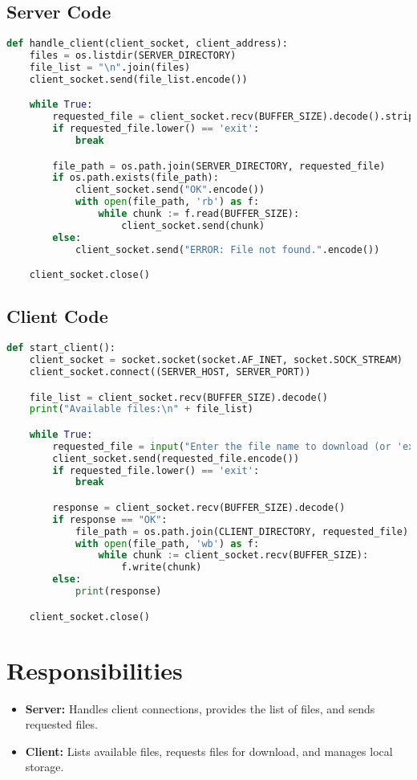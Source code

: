 \documentclass{article}
\begin{document}
\subsection{Server Code}
\begin{lstlisting}[language=Python, caption={Server File Handling}]
def handle_client(client_socket, client_address):
    files = os.listdir(SERVER_DIRECTORY)
    file_list = "\n".join(files)
    client_socket.send(file_list.encode())

    while True:
        requested_file = client_socket.recv(BUFFER_SIZE).decode().strip()
        if requested_file.lower() == 'exit':
            break

        file_path = os.path.join(SERVER_DIRECTORY, requested_file)
        if os.path.exists(file_path):
            client_socket.send("OK".encode())
            with open(file_path, 'rb') as f:
                while chunk := f.read(BUFFER_SIZE):
                    client_socket.send(chunk)
        else:
            client_socket.send("ERROR: File not found.".encode())

    client_socket.close()
\end{lstlisting}

\clearpage
\subsection{Client Code}
\begin{lstlisting}[language=Python, caption={Client File Request}]
def start_client():
    client_socket = socket.socket(socket.AF_INET, socket.SOCK_STREAM)
    client_socket.connect((SERVER_HOST, SERVER_PORT))

    file_list = client_socket.recv(BUFFER_SIZE).decode()
    print("Available files:\n" + file_list)

    while True:
        requested_file = input("Enter the file name to download (or 'exit' to quit): ").strip()
        client_socket.send(requested_file.encode())
        if requested_file.lower() == 'exit':
            break

        response = client_socket.recv(BUFFER_SIZE).decode()
        if response == "OK":
            file_path = os.path.join(CLIENT_DIRECTORY, requested_file)
            with open(file_path, 'wb') as f:
                while chunk := client_socket.recv(BUFFER_SIZE):
                    f.write(chunk)
        else:
            print(response)

    client_socket.close()
\end{lstlisting}

\section{Responsibilities}
\begin{itemize}
    \item \textbf{Server:} Handles client connections, provides the list of files, and sends requested files.
    \item \textbf{Client:} Lists available files, requests files for download, and manages local storage.
\end{itemize}
\end{document}
